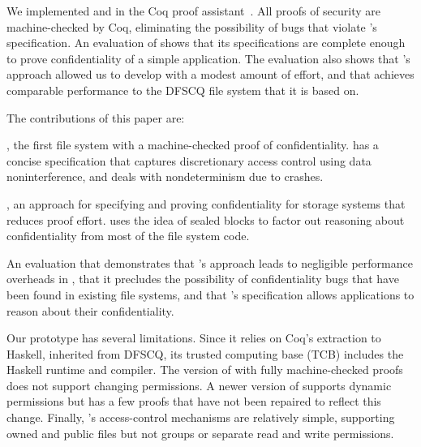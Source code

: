 We implemented \sys and \sfscq in the Coq proof assistant~\cite{coq}.  All proofs of security are
machine-checked by Coq, eliminating the possibility of bugs that
violate \sfscq's specification.  An evaluation of \sfscq shows that its
specifications are complete enough to prove confidentiality of a simple
application.  The evaluation also shows that \sys's approach allowed us
to develop \sfscq with a modest amount of effort, and that \sfscq achieves
comparable performance to the DFSCQ file system that it is based on.

The contributions of this paper are:

\begin{CompactItemize}

\item \sfscq, the first file system with a machine-checked proof of
  confidentiality.  \sfscq has a concise specification that captures
  discretionary access control using data noninterference, and deals
  with nondeterminism due to crashes.

\item \sys, an approach for specifying and proving confidentiality
  for storage systems that reduces proof effort.  \sys uses the
  idea of sealed blocks to factor out reasoning about confidentiality
  from most of the file system code.

\item An evaluation that demonstrates that \sys's approach leads to
  negligible performance overheads in \sfscq, that it precludes the
  possibility of confidentiality bugs that have been found in existing
  file systems, and that \sfscq's specification allows applications to
  reason about their confidentiality.

\end{CompactItemize}

Our \sfscq prototype has several limitations.
Since it relies on Coq's extraction to Haskell, inherited from DFSCQ,
its trusted computing base (TCB) includes the Haskell runtime and
compiler.
The version of \sfscq with fully machine-checked proofs does not support
changing permissions.
A newer version of \sfscq supports dynamic permissions but has a
few proofs that have not been repaired to reflect this change.
Finally, \sfscq's access-control mechanisms are relatively simple,
supporting owned and public files but not groups or separate read and
write permissions.

\fi
